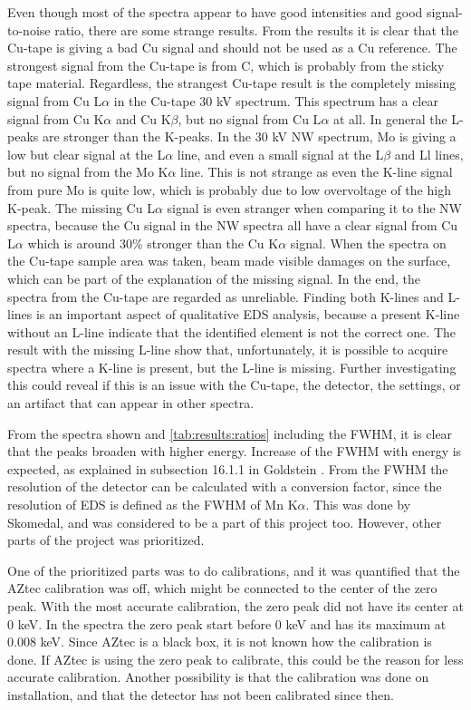 Even though most of the spectra appear to have good intensities and good signal-to-noise ratio, there are some strange results.
From the results it is clear that the Cu-tape is giving a bad Cu signal and should not be used as a Cu reference.
The strongest signal from the Cu-tape is from C, which is probably from the sticky tape material.
Regardless, the strangest Cu-tape result is the completely missing signal from Cu L$\alpha$ in the Cu-tape 30 kV spectrum.
This spectrum has a clear signal from Cu K$\alpha$ and Cu K$\beta$, but no signal from Cu L$\alpha$ at all.
In general the L-peaks are stronger than the K-peaks.
In the 30 kV NW spectrum, Mo is giving a low but clear signal at the L$\alpha$ line, and even a small signal at the L$\beta$ and Ll lines, but no signal from the Mo K$\alpha$ line.
This is not strange as even the K-line signal from pure Mo is quite low, which is probably due to low overvoltage of the high K-peak.
The missing Cu L$\alpha$ signal is even stranger when comparing it to the NW spectra, because the Cu signal in the NW spectra all have a clear signal from Cu L$\alpha$ which is around 30\% stronger than the Cu K$\alpha$ signal.
When the spectra on the Cu-tape sample area was taken, beam made visible damages on the surface, which can be part of the explanation of the missing signal.
In the end, the spectra from the Cu-tape are regarded as unreliable.
Finding both K-lines and L-lines is an important aspect of qualitative EDS analysis, because a present K-line without an L-line indicate that the identified element is not the correct one.
The result with the missing L-line show that, unfortunately, it is possible to acquire spectra where a K-line is present, but the L-line is missing.
Further investigating this could reveal if this is an issue with the Cu-tape, the detector, the settings, or an artifact that can appear in other spectra.


From the spectra shown and \cref{tab:results:ratios} including the FWHM, it is clear that the peaks broaden with higher energy.
Increase of the FWHM with energy is expected, as explained in subsection 16.1.1 in Goldstein \cite{goldstein_scanning_2018}.
From the FWHM the resolution of the detector can be calculated with a conversion factor, since the resolution of EDS is defined as the FWHM of Mn K$\alpha$.
This was done by Skomedal, and was considered to be a part of this project too.
However, other parts of the project was prioritized.


One of the prioritized parts was to do calibrations, and it was quantified that the AZtec calibration was off, which might be connected to the center of the zero peak.
With the most accurate calibration, the zero peak did not have its center at 0 keV.
In the spectra the zero peak start before 0 keV and has its maximum at 0.008 keV.
Since AZtec is a black box, it is not known how the calibration is done.
If AZtec is using the zero peak to calibrate, this could be the reason for less accurate calibration.
Another possibility is that the calibration was done on installation, and that the detector has not been calibrated since then.


